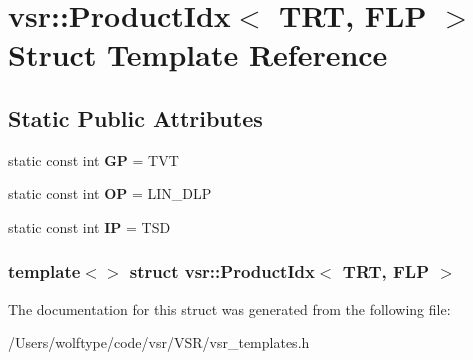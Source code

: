 \hypertarget{structvsr_1_1_product_idx_3_01_t_r_t_00_01_f_l_p_01_4}{\section{vsr\-:\-:Product\-Idx$<$ T\-R\-T, F\-L\-P $>$ Struct Template Reference}
\label{structvsr_1_1_product_idx_3_01_t_r_t_00_01_f_l_p_01_4}
}
\subsection*{Static Public Attributes}
\begin{DoxyCompactItemize}
\item 
\hypertarget{structvsr_1_1_product_idx_3_01_t_r_t_00_01_f_l_p_01_4_ab6e503d41049e1de86bd7f2984aa8bac}{static const int {\bfseries G\-P} = T\-V\-T}\label{structvsr_1_1_product_idx_3_01_t_r_t_00_01_f_l_p_01_4_ab6e503d41049e1de86bd7f2984aa8bac}

\item 
\hypertarget{structvsr_1_1_product_idx_3_01_t_r_t_00_01_f_l_p_01_4_afd2750f55b0ef208bcc9ae13e8d83a20}{static const int {\bfseries O\-P} = L\-I\-N\-\_\-\-D\-L\-P}\label{structvsr_1_1_product_idx_3_01_t_r_t_00_01_f_l_p_01_4_afd2750f55b0ef208bcc9ae13e8d83a20}

\item 
\hypertarget{structvsr_1_1_product_idx_3_01_t_r_t_00_01_f_l_p_01_4_a9db0aae852c427acf5c8a1b02e116a06}{static const int {\bfseries I\-P} = T\-S\-D}\label{structvsr_1_1_product_idx_3_01_t_r_t_00_01_f_l_p_01_4_a9db0aae852c427acf5c8a1b02e116a06}

\end{DoxyCompactItemize}
\subsubsection*{template$<$$>$ struct vsr\-::\-Product\-Idx$<$ T\-R\-T, F\-L\-P $>$}



The documentation for this struct was generated from the following file\-:\begin{DoxyCompactItemize}
\item 
/\-Users/wolftype/code/vsr/\-V\-S\-R/vsr\-\_\-templates.\-h\end{DoxyCompactItemize}
